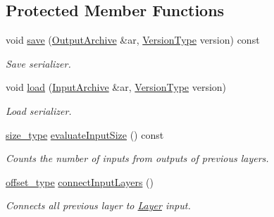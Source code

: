 \subsection*{Protected Member Functions}
\begin{DoxyCompactItemize}
\item 
void \hyperlink{classffnn_1_1layer_1_1_layer_ac265fc929a178b111337226dd1cb62b6}{save} (\hyperlink{classffnn_1_1internal_1_1_serializable_acf5baead716eb277337a4437e88a5743}{Output\-Archive} \&ar, \hyperlink{classffnn_1_1internal_1_1_serializable_a32fe7d82b0caf9fe8b6fb7c312a26028}{Version\-Type} version) const 
\begin{DoxyCompactList}\small\item\em Save serializer. \end{DoxyCompactList}\item 
void \hyperlink{classffnn_1_1layer_1_1_layer_a23f5f3c958d888632010327471c7b012}{load} (\hyperlink{classffnn_1_1internal_1_1_serializable_aadc27d79d606f35a82dd88bad33fa6d2}{Input\-Archive} \&ar, \hyperlink{classffnn_1_1internal_1_1_serializable_a32fe7d82b0caf9fe8b6fb7c312a26028}{Version\-Type} version)
\begin{DoxyCompactList}\small\item\em Load serializer. \end{DoxyCompactList}\item 
\hyperlink{namespaceffnn_a63b90a2fd70eb76684eac482a51633e5}{size\-\_\-type} \hyperlink{classffnn_1_1layer_1_1_layer_a8ab7812798c4826bb235ef1064715b86}{evaluate\-Input\-Size} () const 
\begin{DoxyCompactList}\small\item\em Counts the number of inputs from outputs of previous layers. \end{DoxyCompactList}\item 
\hyperlink{namespaceffnn_add5752d74b38c6e9b200f3d696fc3ec8}{offset\-\_\-type} \hyperlink{classffnn_1_1layer_1_1_layer_a707f7e1944522080da49d97077ddc649}{connect\-Input\-Layers} ()
\begin{DoxyCompactList}\small\item\em Connects all previous layer to \hyperlink{classffnn_1_1layer_1_1_layer}{Layer} input. \end{DoxyCompactList}\end{DoxyCompactItemize}
